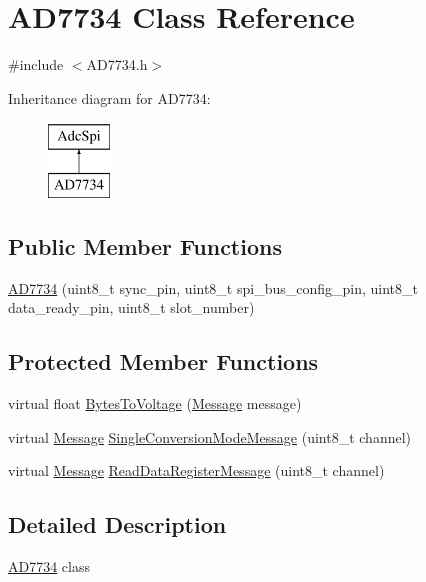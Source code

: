 \hypertarget{classAD7734}{}\section{A\+D7734 Class Reference}
\label{classAD7734}


{\ttfamily \#include $<$A\+D7734.\+h$>$}

Inheritance diagram for A\+D7734\+:\begin{figure}[H]
\begin{center}
\leavevmode
\includegraphics[height=2.000000cm]{classAD7734}
\end{center}
\end{figure}
\subsection*{Public Member Functions}
\begin{DoxyCompactItemize}
\item 
\mbox{\hyperlink{classAD7734_a2bf3cea4357919fda364b8121cd6af4f}{A\+D7734}} (uint8\+\_\+t sync\+\_\+pin, uint8\+\_\+t spi\+\_\+bus\+\_\+config\+\_\+pin, uint8\+\_\+t data\+\_\+ready\+\_\+pin, uint8\+\_\+t slot\+\_\+number)
\end{DoxyCompactItemize}
\subsection*{Protected Member Functions}
\begin{DoxyCompactItemize}
\item 
virtual float \mbox{\hyperlink{classAD7734_afe43654ed83d2af599bea00b93cedc28}{Bytes\+To\+Voltage}} (\mbox{\hyperlink{structAdcSpi_1_1Message}{Message}} message)
\item 
virtual \mbox{\hyperlink{structAdcSpi_1_1Message}{Message}} \mbox{\hyperlink{classAD7734_a6ac58d1c41ad0562329a932d464bfce1}{Single\+Conversion\+Mode\+Message}} (uint8\+\_\+t channel)
\item 
virtual \mbox{\hyperlink{structAdcSpi_1_1Message}{Message}} \mbox{\hyperlink{classAD7734_a2bfd6161eedac320b5b77beb6f209517}{Read\+Data\+Register\+Message}} (uint8\+\_\+t channel)
\end{DoxyCompactItemize}


\subsection{Detailed Description}
\mbox{\hyperlink{classAD7734}{A\+D7734}} class 

